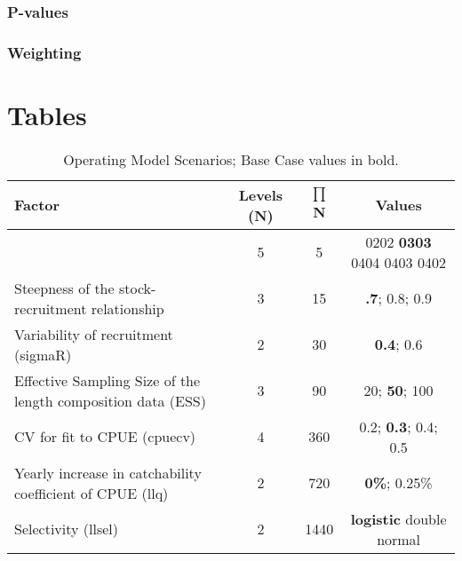 \documentclass[a4paper]{article}
\begin{document}
\subsubsection*{P-values}
\subsubsection*{Weighting}


\newpage


\newpage




\newpage\clearpage



\clearpage
\newpage

\section*{Tables}

\begin{table}[ht]
\label{tab:grid}
\caption{Operating Model Scenarios; Base Case values in bold.}  
\begin{center}
\label{tab:datasumm}
\small

\begin{tabular}{|lccc|}

\hline
Factor & {Levels (N)} & {$\prod$ N} & {Values} \\ %
\hline\hline
{Natural mortality (M)& {5}}  & {  5}  & { 0202  \textbf{0303} 0404 0403 0402}    \\
{Steepness of the stock-recruitment relationship}}& {3} 	 & {15}  & { \textbf{.7}; 0.8; 0.9} \\
{Variability of recruitment (sigmaR)}& {2} 	 & { 30}  & { \textbf{0.4}; 0.6} \\
{Effective Sampling Size of the length composition data (ESS)}& {3} & { 90}  & { 20; \textbf{50}; 100} \\
{CV for fit to CPUE (cpuecv)}& {4} 	 & { 360}  & { 0.2;  \textbf{0.3}; 0.4; 0.5} \\
{Yearly increase in catchability coefficient of CPUE (llq)}& {2} 	 & {  720}  & { \textbf{0\%}; 0.25\%} \\
  {Selectivity (llsel)}& {2}}& {1440}} & { \textbf{logistic} double normal} \\
\hline


\end{tabular}
\end{center}
\end{table}

\end{document}
